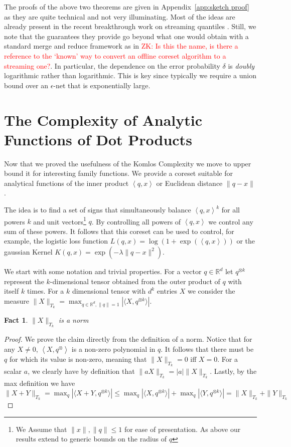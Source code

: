 \documentclass[anon,12pt]{colt2019} %
\newtheorem{fact}[theorem]{Fact}
\newcommand{\zk}[1]{\textcolor{red}{ZK: #1}}
\newcommand{\ip}[1]{\left \langle #1 \right \rangle}
\newcommand{\R}{\mathbb{R}}
\newcommand{\eps}{\epsilon}
\begin{document}
The proofs of the above two theorems are given in Appendix~\ref{app:sketch proof} as they are quite technical and not very illuminating. Most of the ideas are already present in the recent breakthrough work on streaming quantiles \cite{DBLP:conf/focs/KarninLL16}. Still, we note that the guarantees they provide go beyond what one would obtain with a standard merge and reduce framework as in \zk{Is this the name, is there a reference to the `known' way to convert an offline coreset algorithm to a streaming one?}. In particular, the dependence on the error probability $\delta$ is \emph{doubly} logarithmic rather than logarithmic. This is key since typically we require a union bound over an $\eps$-net that is exponentially large.


\section{The Complexity of Analytic Functions of Dot Products} \label{sec:analytic}

Now that we proved the usefulness of the Komlos Complexity we move to upper bound it for interesting family functions. We provide a coreset suitable for analytical functions of the inner product $\ip{q,x}$ or Euclidean distance $\|q-x\|$. 

The idea is to find a set of signs that simultaneously balance $\ip{q,x}^k$ for all powers $k$ and unit vectors\footnote{We Assume that $\|x\|,\|q\| \leq 1$ for ease of presentation. As above our results extend to generic bounds on the radius of $q$} $q$. By controlling all powers of $\ip{q,x}$ we control any sum of these powers. It follows that this coreset can be used to control, for example, the logistic loss function $L(q,x) = \log(1+\exp(\ip{q,x}))$ or the gaussian Kernel $K(q,x) = \exp(-\lambda \|q-x\|^2)$. 


We start with some notation and trivial properties. 
For a vector $q \in \R^d$ let $q^{\otimes k}$ represent the $k$-dimensional tensor obtained from the outer product of $q$ with itself $k$ times. For a $k$ dimensional tensor with $d^k$ entries $X$ we consider the measure
$\|X\|_{T_k} = \max_{q \in \R^d, \|q\|=1} \left| \langle X, q^{\otimes k}\rangle \right|$.
\begin{fact}
$\|X\|_{T_k}$ is a norm
\end{fact}
\begin{proof}
We prove the claim directly from the definition of a norm.
Notice that for any $X \neq 0$, $\ip{X, q^{\otimes}}$ is a non-zero polynomial in $q$. It follows that there must be $q$ for which its value is non-zero, meaning that $\|X\|_{T_k}=0$ iff $X=0$. For a scalar $a$, we clearly have by definition that
$\|aX\|_{T_k} = |a|\|X\|_{T_k}$.  Lastly, by the max definition we  have
$ \|X+Y\|_{T_k} =  \max_q \left| \langle X+Y, q^{\otimes k}\rangle \right| \leq 
\max_q \left| \langle X, q^{\otimes k}\rangle \right| + \max_q\left| \langle Y, q^{\otimes k}\rangle \right| = \|X\|_{T_k} + \|Y\|_{T_k}$
\end{proof}
\end{document}
